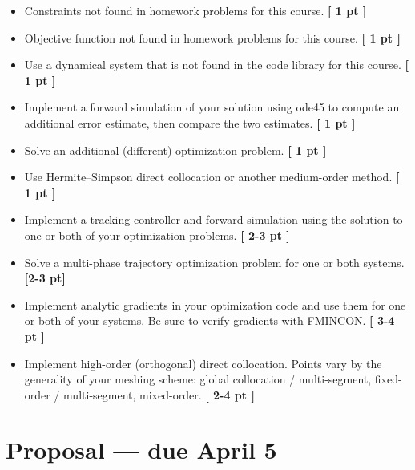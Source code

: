 \vspace{-0.0em} \begin{itemize}  \setlength\itemsep{0em} \setlength\itemindent{18pt}

\item Constraints not found in homework problems for this course.
      \textbf{[ 1 pt ]}

\item Objective function not found in homework problems for this course.
      \textbf{[ 1 pt ]}

\item Use a dynamical system that is not found in the code library for this course.
      \textbf{[ 1 pt ]}

\item Implement a forward simulation of your solution using ode45 to compute
      an additional error estimate, then compare the two estimates.
      \textbf{[ 1 pt ]}

\item Solve an additional (different) optimization problem.
      \textbf{[ 1 pt ]}

\item Use Hermite--Simpson direct collocation or another medium-order method.
      \textbf{[ 1 pt ]}

\item Implement a tracking controller and forward simulation using the solution
      to one or both of your optimization problems.
      \textbf{[ 2-3 pt ]}

\item Solve a multi-phase trajectory optimization problem for one or both systems.
      \textbf{[2-3 pt]}

\item Implement analytic gradients in your optimization code and use them for
      one or both of your systems. Be sure to verify gradients with FMINCON.
      \textbf{[ 3-4 pt ]}

\item Implement high-order (orthogonal) direct collocation. Points vary by the
      generality of your meshing scheme:
      global collocation / multi-segment, fixed-order / multi-segment, mixed-order.
      \textbf{[ 2-4 pt ]}

\end{itemize}


\section*{Proposal  --- due April 5}

